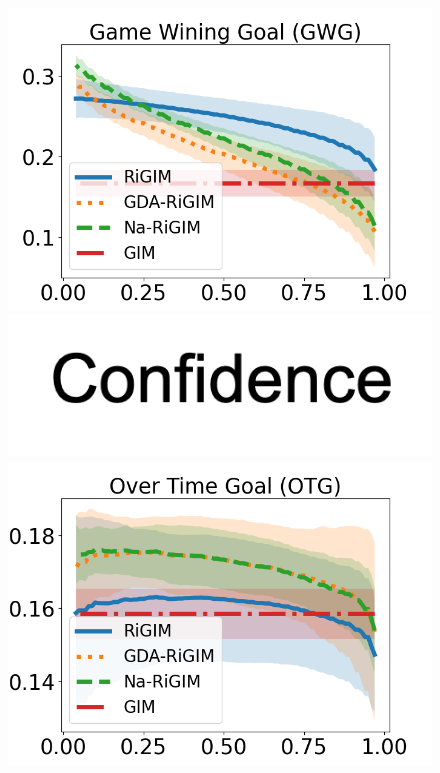 \documentclass{article}
\begin{document}
\begin{figure}[htbp]
\begin{minipage}{0.16\textwidth}
    \includegraphics[scale=0.14]{figures/risk_curve_GWG_shadow.png}\par
    \vspace{-0.05in}
    \includegraphics[scale=0.12]{figures/confidence_x_label.png}
    \end{minipage}
    \begin{minipage}{0.16\textwidth}
    \centering
    \includegraphics[scale=0.14]{figures/risk_curve_OTG_shadow.png}\par

\end{minipage}
\end{figure}
\end{document}
